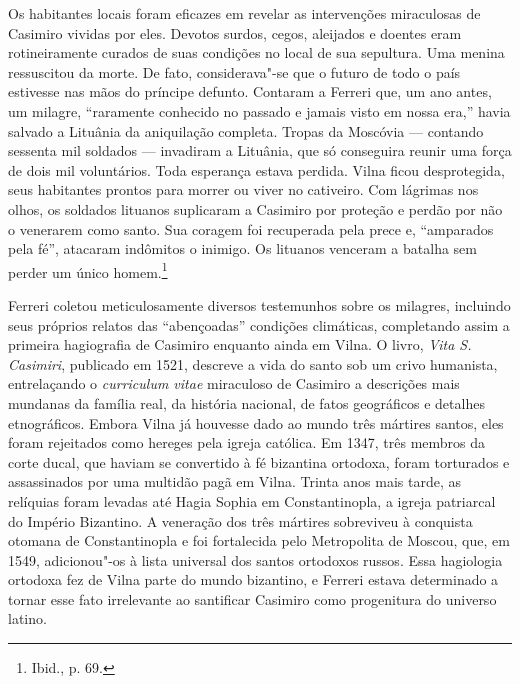Os habitantes locais foram eficazes em revelar as intervenções
miraculosas de Casimiro vividas por eles. Devotos surdos, cegos,
aleijados e doentes eram rotineiramente curados de suas condições no
local de sua sepultura. Uma menina ressuscitou da morte. De fato,
considerava"-se que o futuro de todo o país estivesse nas mãos do
príncipe defunto. Contaram a Ferreri que, um ano antes, um milagre,
``raramente conhecido no passado e jamais visto em nossa era,'' havia
salvado a Lituânia da aniquilação completa. Tropas da Moscóvia ---
contando sessenta mil soldados --- invadiram a Lituânia, que só conseguira
reunir uma força de dois mil voluntários. Toda esperança estava perdida.
Vilna ficou desprotegida, seus habitantes prontos para morrer ou viver
no cativeiro. Com lágrimas nos olhos, os soldados lituanos suplicaram a
Casimiro por proteção e perdão por não o venerarem como santo. Sua
coragem foi recuperada pela prece e, ``amparados pela fé'', atacaram
indômitos o inimigo. Os lituanos venceram a batalha sem perder um único
homem.\footnote{Ibid., p. 69.}

%

Ferreri coletou meticulosamente diversos testemunhos sobre os milagres,
incluindo seus próprios relatos das ``abençoadas'' condições climáticas,
completando assim a primeira hagiografia de Casimiro enquanto ainda em
Vilna. O livro, \textit{Vita S. Casimiri}, publicado em 1521, descreve a
vida do santo sob um crivo humanista, entrelaçando o \textit{curriculum
vitae} miraculoso de Casimiro a descrições mais mundanas da família
real, da história nacional, de fatos geográficos e detalhes
etnográficos. Embora Vilna já houvesse dado ao mundo três mártires
santos, eles foram rejeitados como hereges pela igreja católica. Em
1347, três membros da corte ducal, que haviam se convertido à fé
bizantina ortodoxa, foram torturados e assassinados por uma multidão
pagã em Vilna. Trinta anos mais tarde, as relíquias foram levadas até
Hagia Sophia em Constantinopla, a igreja patriarcal do Império
Bizantino. A veneração dos três mártires sobreviveu à conquista otomana
de Constantinopla e foi fortalecida pelo Metropolita de Moscou, que, em
1549, adicionou"-os à lista universal dos santos ortodoxos russos. Essa
hagiologia ortodoxa fez de Vilna parte do mundo bizantino, e Ferreri
estava determinado a tornar esse fato irrelevante ao santificar Casimiro
como progenitura do universo latino.

